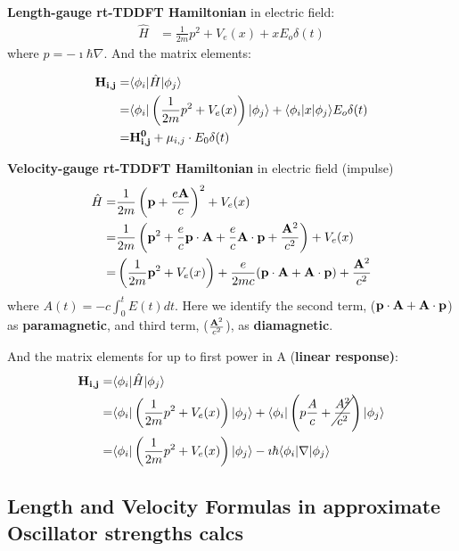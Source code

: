 \documentclass[11pt]{article}
\begin{document}
{\bf Length-gauge rt-TDDFT Hamiltonian}  in   electric field:
\begin{align}
 \hat H  &=  \frac{1}{2m} p^2  + V_{e}(x)  +  x E_o\delta(t) 
\end{align}
where  $p= -\imath  \hbar \nabla$.
And the matrix elements:

\begin{align}
 \vb{H_{i,j}} =& \langle \phi_i| \hat H| \phi_j \rangle  \\  \nonumber
        = & \langle \phi_i| \left( \frac{1}{2m} p^2  + V_{e}(x)  \right)  |\phi_j\rangle  + 
           \langle \phi_i|   x   |\phi_j\rangle E_o\delta(t)   \\ \nonumber
         =&   \vb{  H_{i,j}^0 }  + \vb{ \mu}_{i,j}  \cdot E_0\delta(t)
\end{align}

{\bf Velocity-gauge rt-TDDFT Hamiltonian}  in electric field (impulse)
\begin{align}
 \hat H  =&  \frac{1}{2m} \left(\vb p +  \frac{e \vb A}{c}\right)^2  + V_{e}(x)   \\
    = &  \frac{1}{2m} \left(\vb p^2  + \frac{e}{c} \vb{ p \cdot A}  +   \frac{e}{c} \vb{ A \cdot p} +  \frac{\vb A^2}{c^2}  \right)  + V_e(x)  \\
    =&   \left( \frac{1}{2m} \vb p^2   + V_e(x)  \right)  + 
    \frac{e}{2m c} (\vb{  p \cdot A + A \cdot p}) +  \frac{\vb A^2}{c^2} 
\end{align}
where   $A(t)   = -c \int_0^t E(t)dt$.  Here we identify the second term, ($\vb{  p  \cdot A  +A \cdot p}$) as {\bf paramagnetic}, and third  term, ($  \frac{\vb A^2}{c^2}$),  as   {\bf diamagnetic}.

And the matrix elements for up to first power in A  ({\bf linear response)}:
\begin{align}
 \vb{H_{i,j}} =& \langle \phi_i| \hat H| \phi_j \rangle  \\  \nonumber
        = & \langle \phi_i| \left( \frac{1}{2m} p^2  + V_{e}(x)  \right)  |\phi_j\rangle  + 
           \langle \phi_i|  \left( p \frac{A}{c}  +  \cancel{\frac{A^2}{c^2} } \right)  |\phi_j\rangle \\ \nonumber
     =&     \langle \phi_i| \left( \frac{1}{2m} p^2  + V_{e}(x)  \right)  |\phi_j\rangle  - \imath \hbar    \langle \phi_i|  \nabla |\phi_j \rangle 
\end{align}

\subsection{Length and Velocity Formulas in approximate  Oscillator strengths calcs}
\end{document}
